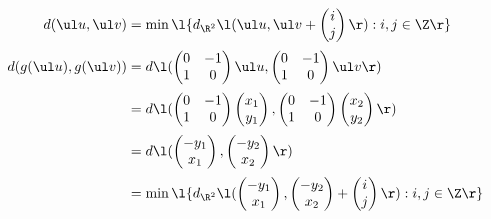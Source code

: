 \documentclass[a4paper]{article}
\begin{document}
\begin{align*}
d(\ul u, \ul v) &= \min\l\{ d_{\R^2} \l( \ul u, \ul v + \begin{pmatrix} i \\ j \end{pmatrix} \r)
    : i, j \in \Z \r\} \\[0.5ex]
%
d(g(\ul u), g(\ul v)) &= d \l(
    \begin{pmatrix} 0 & -1 \\ 1 & 0 \end{pmatrix} \ul u,
    \begin{pmatrix} 0 & -1 \\ 1 & 0 \end{pmatrix} \ul v
\r) \\[0.5ex]
%
&= d \l(
    \begin{pmatrix} 0 & -1 \\ 1 & 0 \end{pmatrix} \begin{pmatrix} x_1 \\ y_1 \end{pmatrix},
    \begin{pmatrix} 0 & -1 \\ 1 & 0 \end{pmatrix} \begin{pmatrix} x_2 \\ y_2 \end{pmatrix}
\r) \\[0.5ex]
%
&= d \l(
    \begin{pmatrix} -y_1 \\ x_1 \end{pmatrix},
    \begin{pmatrix} -y_2 \\ x_2 \end{pmatrix}
\r) \\[0.5ex]
%
&= \min\l\{ d_{\R^2} \l(
    \begin{pmatrix} -y_1 \\ x_1 \end{pmatrix},
    \begin{pmatrix} -y_2 \\ x_2 \end{pmatrix} + \begin{pmatrix} i \\ j \end{pmatrix}
\r) : i, j \in \Z \r\} \\[0.5ex]
\end{align*}

\subsection{~} %
\end{document}

